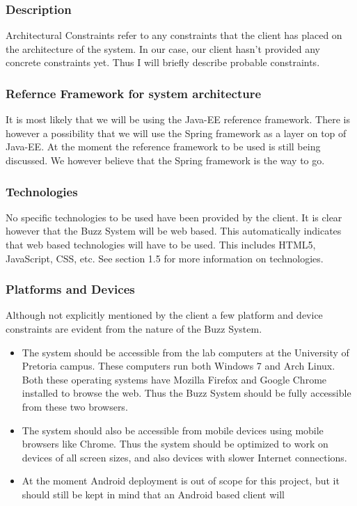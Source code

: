 \subsubsection{Description}

Architectural Constraints refer to any constraints that the client has placed on the architecture of the system. In our case, our client hasn't provided any concrete constraints yet. Thus I will briefly describe probable constraints. 

\subsubsection{Refernce Framework for system architecture}

It is most likely that we will be using the Java-EE reference framework. There is however a possibility that we will use the Spring framework as a layer on top of Java-EE. At the moment the reference framework to be used is still being discussed. We however believe that the Spring framework is the way to go. 

\subsubsection{Technologies}

No specific technologies to be used have been provided by the client. It is clear however that the Buzz System will be web based. This automatically indicates that web based technologies will have to be used. This includes HTML5, JavaScript, CSS, etc. See section 1.5 for more information on technologies. 

\subsubsection{Platforms and Devices}

Although not explicitly mentioned by the client a few platform and device constraints are evident from the nature of the Buzz System.

\begin{itemize}
	\item The system should be accessible from the lab computers at the University of Pretoria campus. These computers run both Windows 7 and Arch Linux. Both these operating systems have Mozilla Firefox and Google Chrome installed to browse the web. Thus the Buzz System should be fully accessible from these two browsers. 

	\item The system should also be accessible from mobile devices using mobile browsers like Chrome. Thus the system should be optimized to work on devices of all screen sizes, and also devices with slower Internet connections. 

	\item At the moment Android deployment is out of scope for this project, but it should still be kept in mind that an Android based client will 
\end{itemize}
